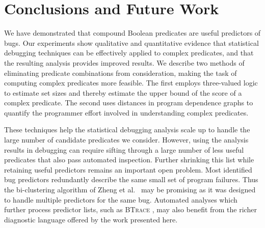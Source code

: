 
\section{Conclusions and Future Work}
\label{sec-conclusion}
We have demonstrated that compound Boolean predicates are useful
predictors of bugs.  Our experiments show qualitative and quantitative
evidence that statistical debugging techniques can be effectively
applied to complex predicates, and that the resulting analysis
provides improved results.  We describe two methods of eliminating
predicate combinations from consideration, making the task of
computing complex predicates more feasible.  The first employs
three-valued logic to estimate set sizes and thereby estimate the
upper bound of the score of a complex predicate.  The second uses
distances in program dependence graphs to quantify the programmer
effort involved in understanding complex predicates.

These techniques help the statistical debugging analysis scale up to
handle the large number of candidate predicates we consider.  However,
using the analysis results in debugging can require sifting through a
large number of less useful predicates that also pass automated
inspection.  Further shrinking this list while retaining useful
predictors remains an important open problem.  Most identified bug
predictors redundantly describe the same small set of program
failures.  Thus the bi-clustering algorithm of Zheng et al.\
\cite{Zheng:2006:SDSIMB} may be promising as it was designed to handle
multiple predictors for the same bug.  Automated analyses which
further process predictor lists, such as \textsc{BTrace}
\cite{Lal:2006:POPAD}, may also benefit from the richer diagnostic
language offered by the work presented here.
